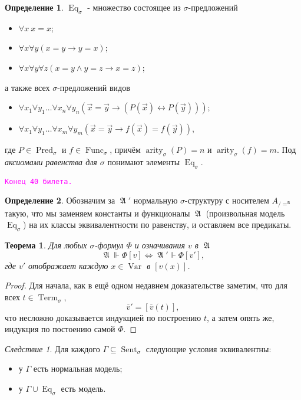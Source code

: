 \documentclass[a4paper,100pt]{article}
\theoremstyle{indented}
\newtheorem{theorem}{Теорема}
\theoremstyle{definition}
\newtheorem{defn}{Определение}
\theoremstyle{remark}
\newtheorem{cons}{Следствие}
\DeclareMathOperator{\ra}{\rightarrow}
\DeclareMathOperator{\Llra}{\Longleftrightarrow}
\DeclareMathOperator{\Pred}{Pred}
\DeclareMathOperator{\Func}{Func}
\DeclareMathOperator{\arity}{arity}
\DeclareMathOperator{\Var}{Var}
\DeclareMathOperator{\Term}{Term}
\DeclareMathOperator{\Sent}{Sent}
\DeclareMathOperator{\Eq}{Eq}
\DeclareMathOperator{\GA}{\mathfrak{A}}
\begin{document}
\begin{defn}
  $\Eq_\sigma$ - множество состоящее из $\sigma$-предложений

  \begin{itemize}
    \item $\forall x \: x=x$; 
    \item $\forall x \forall y (x=y\ra y=x)$; 
    \item $\forall x \forall y \forall z (x=y \wedge y=z \ra x=z)$;
  \end{itemize}
  а также всех $\sigma$-предложений видов 

  \begin{itemize}
    \item $\forall x_1 \forall y_1 \ldots \forall x_n \forall y_n (\vec{x}=\vec{y}\ra (P(\vec{x})\leftrightarrow P(\vec{y})))$; 
    \item $\forall x_1 \forall y_1 \ldots \forall x_m \forall y_m (\vec{x}=\vec{y}\ra f(\vec{x}) = f(\vec{y}))$, 
  \end{itemize}
  где $P\in \Pred_\sigma$ и $f\in \Func_\sigma$, причём $\arity_\sigma(P)=n$ и $\arity_\sigma(f)=m$. Под \textit{аксиомами равенства для $\sigma$} понимают элементы $\Eq_\sigma$. 
\end{defn}

\texttt{\textcolor{magenta}{Конец 40 билета.}} 

\hrulefill

\begin{defn}
  Обозначим за $\GA'$ нормальную $\sigma$-структуру с носителем $A_{/=^{\GA}}$ такую, что мы заменяем константы и функционалы $\GA$ (произвольная модель $\Eq_\sigma$) на их классы эквивалентности по равенству, и оставляем все предикаты.
\end{defn}

\begin{theorem}
  Для любых $\sigma$-формул $\Phi$ и означивания $v$ в $\GA$ 
  \[
    \GA \Vdash \Phi[v] \Llra \GA'\Vdash \Phi[v'], 
  \]
  где $v'$ отображает каждую $x\in \Var$ в $[v(x)]$. 
\end{theorem}

\begin{proof}
  Для начала, как в ещё одном недавнем доказательстве заметим, что для всех $t\in \Term_\sigma$, 
  \[
    \overline{v}'=[\overline{v}(t)],
  \]
  что несложно доказывается индукцией по построению $t$, а затем опять же, индукция по постоению самой $\Phi$. 
\end{proof}

\begin{cons}
  Для каждого $\Gamma\subseteq \Sent_\sigma$ следующие условия эквивалентны: 

  \begin{itemize}
    \item у $\Gamma$ есть нормальная модель; 
    \item у $\Gamma \cup \Eq_\sigma$ есть модель.
  \end{itemize}
\end{cons}
\end{document}
